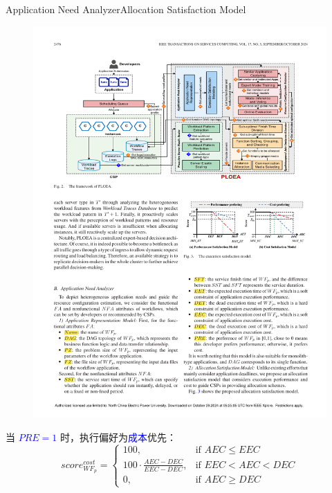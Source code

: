 \documentclass[aspectratio=169]{beamer}
\begin{document}
\begin{frame}{Application Need Analyzer}{Allocation Satisfaction Model}
  \begin{figure}
    \centering
    \includegraphics[height=0.4\textheight]{img/method/satisfaction-model.pdf}
  \end{figure}
  当 \textcolor{blue}{$PRE=1$} 时，执行偏好为\textcolor{blue}{成本}优先：
  \begin{equation*}
    score_{WF_p}^{cost} =
    \begin{cases}
      100, & \text{if } AEC \leqslant EEC \\
      100 \cdot \frac{AEC - DEC}{EEC - DEC}, & \text{if } EEC < AEC < DEC \\
      0, & \text{if } AEC \geqslant DEC
    \end{cases}
  \end{equation*}
\end{frame}
\end{document}
